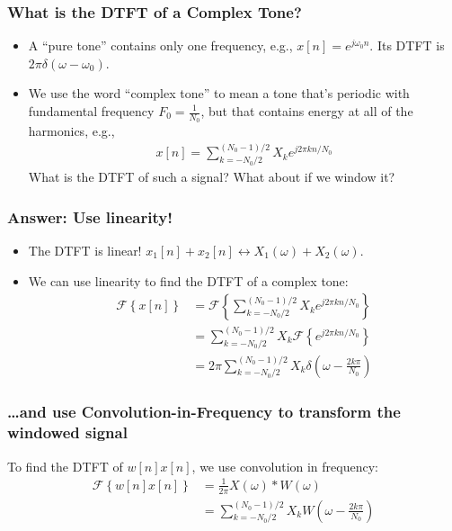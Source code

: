 \documentclass{beamer}
\begin{document}
\begin{frame}
  \frametitle{What is the DTFT of a Complex Tone?}

  \begin{itemize}
    \item A ``pure tone'' contains only one frequency, e.g.,
      $x[n]=e^{j\omega_0 n}$.  Its DTFT is $2\pi\delta(\omega-\omega_0)$.
    \item We use the word ``complex tone'' to mean a tone that's
      periodic with fundamental frequency $F_0=\frac{1}{N_0}$, but
      that contains energy at all of the harmonics, e.g.,
      \begin{align*}
        x[n]=\sum_{k=-N_0/2}^{(N_0-1)/2} X_k e^{j2\pi kn/N_0}
      \end{align*}
      What is the DTFT of such a signal?  What about if we window it?
  \end{itemize}
\end{frame}

\begin{frame}
  \frametitle{Answer: Use linearity!}

  \begin{itemize}
    \item The DTFT is linear!  $x_1[n]+x_2[n]\leftrightarrow
      X_1(\omega)+X_2(\omega)$.
    \item We can use linearity to find the DTFT of a complex tone:
      \begin{align*}
        \mathcal{F}\left\{x[n]\right\}
        &=\mathcal{F}\left\{\sum_{k=-N_0/2}^{(N_0-1)/2} X_k e^{j2\pi kn/N_0}\right\}\\
        &=\sum_{k=-N_0/2}^{(N_0-1)/2} X_k \mathcal{F}\left\{e^{j2\pi kn/N_0}\right\}\\
        &=2\pi\sum_{k=-N_0/2}^{(N_0-1)/2} X_k \delta\left(\omega-\frac{2k\pi}{N_0}\right)
      \end{align*}
  \end{itemize}
\end{frame}

\begin{frame}
  \frametitle{\ldots and use Convolution-in-Frequency to transform the windowed signal}

  To find the DTFT of $w[n]x[n]$, we use convolution in frequency:
  \begin{align*}
    \mathcal{F}\left\{w[n]x[n]\right\}
    &=\frac{1}{2\pi}X(\omega)\ast W(\omega)\\
    &=\sum_{k=-N_0/2}^{(N_0-1)/2} X_k W\left(\omega-\frac{2k\pi}{N_0}\right)
  \end{align*}
\end{frame}
\end{document}
